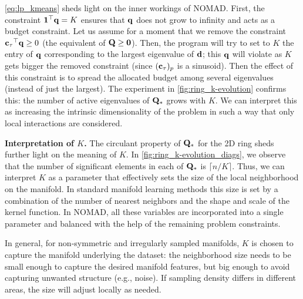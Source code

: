 \documentclass[twoside,11pt]{article}
\begin{document}
\cref{eq:lp_kmeans} sheds light on the inner workings of NOMAD. First, the constraint ${{\mathbf{1}}}^\top {\mathbf{q}} = K$ ensures that ${\mathbf{q}}$ does not grow to infinity and acts as a budget constraint. Let us assume for a moment that we remove the constraint ${{\mathbf{c}}_\tau}^\top {\mathbf{q}} \geq 0$ (the equivalent of ${\mathbf{Q}} \geq {\mathbf{0}}$). Then, the program will try to set to $K$ the entry of ${\mathbf{q}}$ corresponding to the largest eigenvalue of ${\mathbf{d}}$; this ${\mathbf{q}}$ will violate as $K$ gets bigger the removed constraint (since $({\mathbf{c}}_\tau)_p$ is a sinusoid). Then the effect of this constraint is to spread the allocated budget among several eigenvalues (instead of just the largest). The experiment in \cref{fig:ring_k-evolution} confirms this: the number of active eigenvalues of ${\mathbf{Q}}_*$ grows with $K$. We can interpret this as increasing the intrinsic dimensionality of the problem in such a way that only local interactions are considered.

\noindent\textbf{Interpretation of $K$.}
The circulant property of ${\mathbf{Q}}_*$ for the 2D ring sheds further light on the meaning of $K$. In \cref{fig:ring_k-evolution_diags}, we observe that the number of significant elements in each of ${\mathbf{Q}}_*$ is $\lceil n / K \rceil$. Thus, we can interpret $K$ as a parameter that effectively sets the size of the local neighborhood on the manifold. In standard manifold learning methods this size is set by a combination of the number of nearest neighbors and the shape and scale of the kernel function. In NOMAD, all these variables are incorporated into a single parameter and balanced with the help of the remaining problem constraints.

In general, for non-symmetric and irregularly sampled manifolds, $K$ is chosen to capture the manifold underlying the dataset: the neighborhood size needs to be small enough to capture the desired manifold features, but big enough to avoid capturing unwanted structure (e.g., noise). If sampling density differs in different areas, the size will adjust locally as needed.
\end{document}
